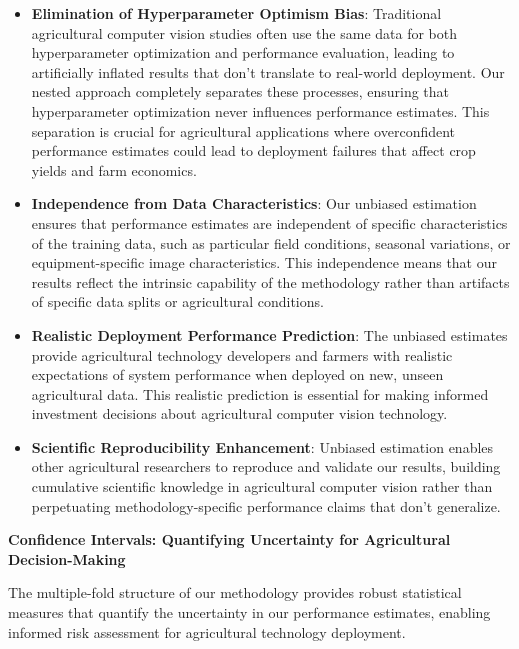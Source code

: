 \begin{itemize}
    \item \textbf{Elimination of Hyperparameter Optimism Bias}: Traditional agricultural computer vision studies often use the same data for both hyperparameter optimization and performance evaluation, leading to artificially inflated results that don't translate to real-world deployment. Our nested approach completely separates these processes, ensuring that hyperparameter optimization never influences performance estimates. This separation is crucial for agricultural applications where overconfident performance estimates could lead to deployment failures that affect crop yields and farm economics.
    
    \item \textbf{Independence from Data Characteristics}: Our unbiased estimation ensures that performance estimates are independent of specific characteristics of the training data, such as particular field conditions, seasonal variations, or equipment-specific image characteristics. This independence means that our results reflect the intrinsic capability of the methodology rather than artifacts of specific data splits or agricultural conditions.
    
    \item \textbf{Realistic Deployment Performance Prediction}: The unbiased estimates provide agricultural technology developers and farmers with realistic expectations of system performance when deployed on new, unseen agricultural data. This realistic prediction is essential for making informed investment decisions about agricultural computer vision technology.
    
    \item \textbf{Scientific Reproducibility Enhancement}: Unbiased estimation enables other agricultural researchers to reproduce and validate our results, building cumulative scientific knowledge in agricultural computer vision rather than perpetuating methodology-specific performance claims that don't generalize.
\end{itemize}

\textbf{Confidence Intervals: Quantifying Uncertainty for Agricultural Decision-Making}

The multiple-fold structure of our methodology provides robust statistical measures that quantify the uncertainty in our performance estimates, enabling informed risk assessment for agricultural technology deployment.

